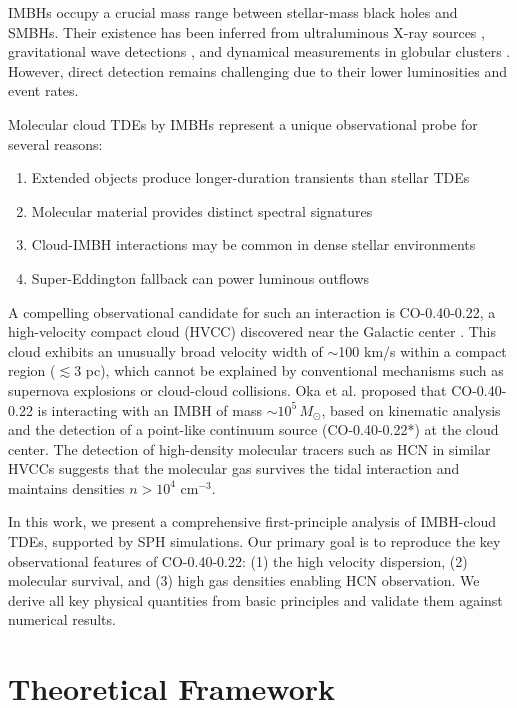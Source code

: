 \documentclass[twocolumn,amsmath,amssymb,prd,superscriptaddress,nofootinbib]{revtex4-2}
\begin{document}
IMBHs occupy a crucial mass range between stellar-mass black holes and SMBHs. Their existence has been inferred from ultraluminous X-ray sources \cite{Farrell2009}, gravitational wave detections \cite{Abbott2020}, and dynamical measurements in globular clusters \cite{Gebhardt2005}. However, direct detection remains challenging due to their lower luminosities and event rates.

Molecular cloud TDEs by IMBHs represent a unique observational probe for several reasons:
\begin{enumerate}
    \item Extended objects produce longer-duration transients than stellar TDEs
    \item Molecular material provides distinct spectral signatures
    \item Cloud-IMBH interactions may be common in dense stellar environments
    \item Super-Eddington fallback can power luminous outflows
\end{enumerate}

A compelling observational candidate for such an interaction is CO-0.40-0.22, a high-velocity compact cloud (HVCC) discovered near the Galactic center \cite{Oka2016,Oka2017}. This cloud exhibits an unusually broad velocity width of $\sim$100 km/s within a compact region ($\lesssim 3$ pc), which cannot be explained by conventional mechanisms such as supernova explosions or cloud-cloud collisions. Oka et al. \cite{Oka2017} proposed that CO-0.40-0.22 is interacting with an IMBH of mass $\sim 10^5\,M_\odot$, based on kinematic analysis and the detection of a point-like continuum source (CO-0.40-0.22*) at the cloud center. The detection of high-density molecular tracers such as HCN in similar HVCCs suggests that the molecular gas survives the tidal interaction and maintains densities $n > 10^4$ cm$^{-3}$.

In this work, we present a comprehensive first-principle analysis of IMBH-cloud TDEs, supported by SPH simulations. Our primary goal is to reproduce the key observational features of CO-0.40-0.22: (1) the high velocity dispersion, (2) molecular survival, and (3) high gas densities enabling HCN observation. We derive all key physical quantities from basic principles and validate them against numerical results.

\section{Theoretical Framework}
\label{sec:theory}
\end{document}
